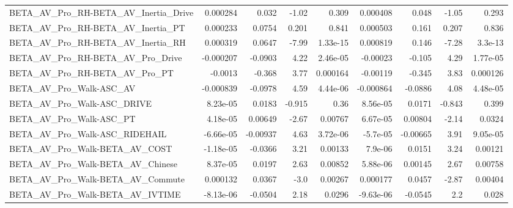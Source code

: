\begin{tabular}{lrrrrrrrr}
BETA\_AV\_Pro\_RH-BETA\_AV\_Inertia\_Drive               &    0.000284 &        0.032 &    -1.02 &    0.309 &   0.000408 &       0.048 &        -1.05 &         0.293 \\
BETA\_AV\_Pro\_RH-BETA\_AV\_Inertia\_PT                  &    0.000233 &       0.0754 &    0.201 &    0.841 &   0.000503 &       0.161 &        0.207 &         0.836 \\
BETA\_AV\_Pro\_RH-BETA\_AV\_Inertia\_RH                  &    0.000319 &       0.0647 &    -7.99 & 1.33e-15 &   0.000819 &       0.146 &        -7.28 &       3.3e-13 \\
BETA\_AV\_Pro\_RH-BETA\_AV\_Pro\_Drive                   &   -0.000207 &      -0.0903 &     4.22 & 2.46e-05 &   -0.00023 &      -0.105 &         4.29 &      1.77e-05 \\
BETA\_AV\_Pro\_RH-BETA\_AV\_Pro\_PT                      &     -0.0013 &       -0.368 &     3.77 & 0.000164 &   -0.00119 &      -0.345 &         3.83 &      0.000126 \\
BETA\_AV\_Pro\_Walk-ASC\_AV                            &   -0.000839 &      -0.0978 &     4.59 & 4.44e-06 &  -0.000864 &     -0.0886 &         4.08 &      4.48e-05 \\
BETA\_AV\_Pro\_Walk-ASC\_DRIVE                         &    8.23e-05 &       0.0183 &   -0.915 &     0.36 &   8.56e-05 &      0.0171 &       -0.843 &         0.399 \\
BETA\_AV\_Pro\_Walk-ASC\_PT                            &    4.18e-05 &      0.00649 &    -2.67 &  0.00767 &   6.67e-05 &     0.00804 &        -2.14 &        0.0324 \\
BETA\_AV\_Pro\_Walk-ASC\_RIDEHAIL                      &   -6.66e-05 &     -0.00937 &     4.63 & 3.72e-06 &   -5.7e-05 &    -0.00665 &         3.91 &      9.05e-05 \\
BETA\_AV\_Pro\_Walk-BETA\_AV\_COST                      &   -1.18e-05 &      -0.0366 &     3.21 &  0.00133 &    7.9e-06 &      0.0151 &         3.24 &       0.00121 \\
BETA\_AV\_Pro\_Walk-BETA\_AV\_Chinese                   &    8.37e-05 &       0.0197 &     2.63 &  0.00852 &   5.88e-06 &     0.00145 &         2.67 &       0.00758 \\
BETA\_AV\_Pro\_Walk-BETA\_AV\_Commute                   &    0.000132 &       0.0367 &     -3.0 &  0.00267 &   0.000177 &      0.0457 &        -2.87 &       0.00404 \\
BETA\_AV\_Pro\_Walk-BETA\_AV\_IVTIME                    &   -8.13e-06 &      -0.0504 &     2.18 &   0.0296 &  -9.63e-06 &     -0.0545 &          2.2 &         0.028 \\

\end{tabular}
